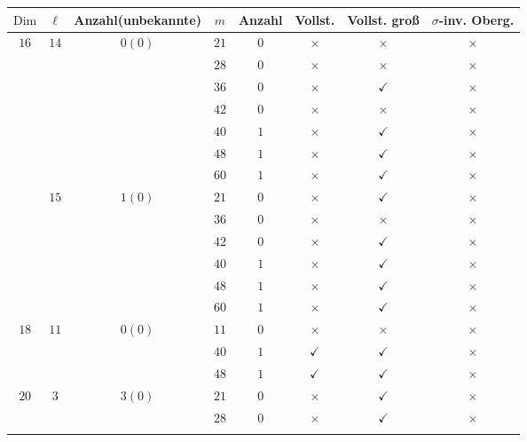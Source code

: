 \documentclass[12pt,a4paper,halfparskip,headsepline,bibtotocnumbered]{scrreprt}
\theoremstyle{nummermitklammern}
\theoremstyle{nonumberbreak}
\newcommand{\Dim}{\text{Dim}}
\begin{document}
\begin{table}[H]
	\centering
	\begin{tabular}{|c|c|c|c|c|c|c|c|}
		\hline		
		$\Dim$					&$\ell$					&{Anzahl(unbekannte)}		&$m$	&Anzahl	&Vollst.	&Vollst. groß	&$\sigma$-inv. Oberg.\\ \hline
		\multirow{13}{*}{$16$}	&\multirow{7}{*}{$14$}&\multirow{7}{*}{$0(0)$}		&$21$	&$0$	&$\times$		&$\times$		&$\times$\\ \cline{4-8}
								&						&							&$28$	&$0$	&$\times$		&$\times$		&$\times$\\ \cline{4-8}
								&						&							&$36$	&$0$	&$\times$		&$\checkmark$	&$\times$\\ \cline{4-8}
								&						&							&$42$	&$0$	&$\times$		&$\times$		&$\times$\\ \cline{4-8}
								&						&							&$40$	&$1$	&$\times$		&$\checkmark$	&$\times$\\ \cline{4-8}
								&						&							&$48$	&$1$	&$\times$		&$\checkmark$	&$\times$\\ \cline{4-8}
								&						&							&$60$	&$1$	&$\times$		&$\checkmark$	&$\times$\\ \cline{2-8}
								&\multirow{6}{*}{$15$}&\multirow{6}{*}{$1(0)$}		&$21$	&$0$	&$\times$		&$\checkmark$	&$\times$\\ \cline{4-8}
								&						&							&$36$	&$0$	&$\times$		&$\times$		&$\times$\\ \cline{4-8}
								&						&							&$42$	&$0$	&$\times$		&$\checkmark$	&$\times$\\ \cline{4-8}
								&						&							&$40$	&$1$	&$\times$		&$\checkmark$	&$\times$\\ \cline{4-8}
								&						&							&$48$	&$1$	&$\times$		&$\checkmark$	&$\times$\\ \cline{4-8}
								&						&							&$60$	&$1$	&$\times$		&$\checkmark$	&$\times$\\ \hline
		\multirow{3}{*}{$18$}	&\multirow{3}{*}{$11$}	&\multirow{3}{*}{$0(0)$}	&$11$	&$0$	&$\times$		&$\times$		&$\times$\\ \cline{4-8}
								&						&							&$40$	&$1$	&$\checkmark$	&$\checkmark$	&$\times$\\ \cline{4-8}
								&						&							&$48$	&$1$	&$\checkmark$	&$\checkmark$	&$\times$\\ \hline
		\multirow{9}{*}{$20$}	&\multirow{9}{*}{$3$}	&\multirow{9}{*}{$3(0)$}	&$21$	&$0$	&$\times$		&$\checkmark$	&$\times$\\ \cline{4-8}
								&						&							&$28$	&$0$	&$\times$		&$\checkmark$	&$\times$\\ \cline{4-8}

\end{tabular}
\end{table}
\end{document}
